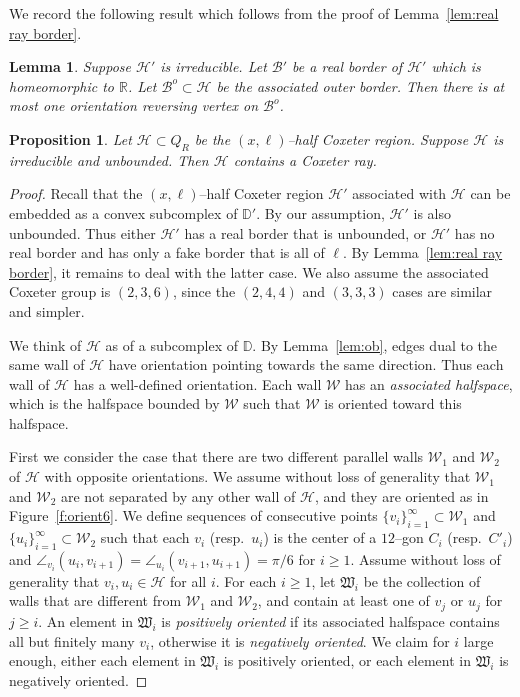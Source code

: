 \documentclass[11pt]{amsart}
\newcommand {\B}{\mathcal B}
\newcommand {\D}{\mathbb D}
\newcommand {\h}{\mathcal H}
\newcommand {\W}{\mathcal W}
\newtheorem{lemma}[theorem]{Lemma}
\newtheorem{prop}[theorem]{Proposition}
\theoremstyle{definition}
\begin{document}
We record the following result which follows from the proof of Lemma~\ref{lem:real ray border}.
\begin{lemma}
	\label{lem:at most one reserving point}
Suppose $\h'$ is irreducible. Let $\B'$ be a real border of $\h'$ which is homeomorphic to $\mathbb R$. Let $\B^o\subset \h$ be the associated outer border. Then there is at most one orientation reversing vertex on $\B^o$.
\end{lemma}

\begin{prop}
	\label{prop:half coxeter region contains Coxeter ray}
Let $\h\subset Q_R$ be the $(x,\ell)$--half Coxeter region. Suppose $\h$ is irreducible and unbounded. Then $\h$ contains a Coxeter ray.
\end{prop}

\begin{proof}
Recall that the $(x,\ell)$--half Coxeter region $\h'$ associated with $\h$ can be embedded as a convex subcomplex of $\D'$. By our assumption, $\h'$ is also unbounded. Thus either $\h'$ has a real border that is unbounded, or $\h'$ has no real border and has only a fake border that is all of $\ell$. By Lemma~\ref{lem:real ray border}, it remains to deal with the latter case. We also assume the associated Coxeter group is $(2,3,6)$, since the $(2,4,4)$ and $(3,3,3)$ cases are similar and simpler.

We think of $\h$ as of a subcomplex of $\D$. By Lemma~\ref{lem:ob}, edges dual to the same wall of $\h$ have orientation pointing towards the same direction. Thus each wall of $\h$ has a well-defined orientation. Each wall $\W$ has an \emph{associated halfspace}, which is the halfspace bounded by $\W$ such that $\W$ is oriented toward this halfspace.

First we consider the case that there are two different parallel walls $\W_1$ and $\W_2$ of $\h$ with opposite orientations. We assume without loss of generality that $\W_1$ and $\W_2$ are not separated by any other wall of $\h$, and they are oriented as in Figure~\ref{f:orient6}. We define sequences of consecutive points $\{v_i\}_{i=1}^{\infty}\subset\W_1$ and $\{u_i\}_{i=1}^{\infty}\subset\W_2$ such that each $v_i$ (resp.\ $u_i$) is the center of a $12$--gon $C_{i}$ (resp.\ $C'_i$) and $\angle_{v_i}(u_i,v_{i+1})=\angle_{u_i}(v_{i+1},u_{i+1})=\pi/6$ for $i\ge 1$. Assume without loss of generality that $v_i,u_i\in \h$ for all $i$. For each $i\ge 1$, let $\mathfrak{W}_i$ be the collection of walls that are different from $\W_1$ and $\W_2$, and contain at least one of $v_j$ or $u_j$ for $j\ge i$. An element in $\mathfrak{W}_i$ is \emph{positively oriented} if its associated halfspace contains all but finitely many $v_i$, otherwise it is \emph{negatively oriented}. We claim for $i$ large enough, either each element in $\mathfrak{W}_i$ is positively oriented, or each element in $\mathfrak{W}_i$ is negatively oriented. 


\end{proof}
\end{document}
